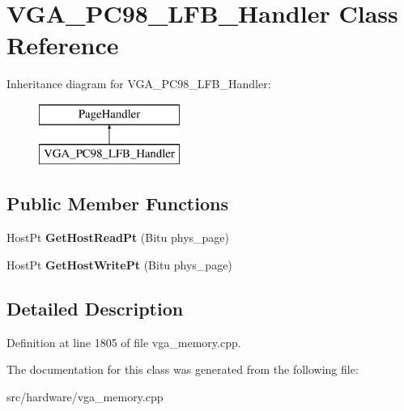 \hypertarget{classVGA__PC98__LFB__Handler}{\section{V\-G\-A\-\_\-\-P\-C98\-\_\-\-L\-F\-B\-\_\-\-Handler Class Reference}
\label{classVGA__PC98__LFB__Handler}
}
Inheritance diagram for V\-G\-A\-\_\-\-P\-C98\-\_\-\-L\-F\-B\-\_\-\-Handler\-:\begin{figure}[H]
\begin{center}
\leavevmode
\includegraphics[height=2.000000cm]{classVGA__PC98__LFB__Handler}
\end{center}
\end{figure}
\subsection*{Public Member Functions}
\begin{DoxyCompactItemize}
\item 
\hypertarget{classVGA__PC98__LFB__Handler_a4adcd67e79fa7efac624f0cb029a6e58}{Host\-Pt {\bfseries Get\-Host\-Read\-Pt} (Bitu phys\-\_\-page)}\label{classVGA__PC98__LFB__Handler_a4adcd67e79fa7efac624f0cb029a6e58}

\item 
\hypertarget{classVGA__PC98__LFB__Handler_a552bc6064954666ef812ae02e62fb039}{Host\-Pt {\bfseries Get\-Host\-Write\-Pt} (Bitu phys\-\_\-page)}\label{classVGA__PC98__LFB__Handler_a552bc6064954666ef812ae02e62fb039}

\end{DoxyCompactItemize}


\subsection{Detailed Description}


Definition at line 1805 of file vga\-\_\-memory.\-cpp.



The documentation for this class was generated from the following file\-:\begin{DoxyCompactItemize}
\item 
src/hardware/vga\-\_\-memory.\-cpp\end{DoxyCompactItemize}
